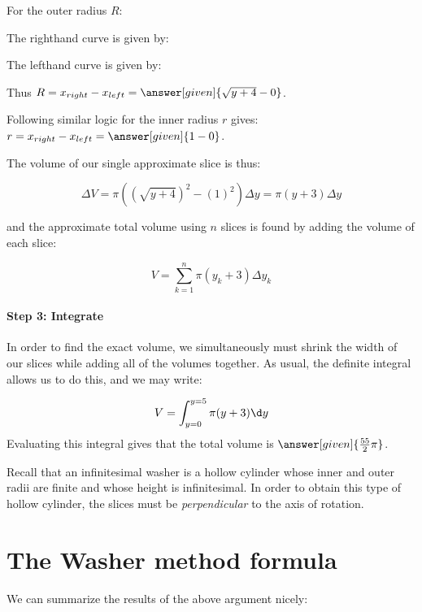 \documentclass{ximera}
\begin{document}
For the outer radius $R$:

The righthand curve is given by:
\begin{multipleChoice}
\end{multipleChoice}

The lefthand curve is given by:
\begin{multipleChoice}
\end{multipleChoice}

Thus $R = x_{right}-x_{left} = \answer[given]{\sqrt{y+4}-0}$.
            
Following similar logic for the inner radius $r$ gives: $r = x_{right}-x_{left} = \answer[given]{1-0}$.   
   
The volume of our single approximate slice is thus:

\[
\Delta V = \pi((\sqrt{y+4})^2-(1)^2)\Delta y = \pi(y+3)\Delta y
\]   
   
and the approximate total volume using $n$ slices is found by adding the volume of each slice:
   
\[
V = \sum_{k=1}^n \pi(y_k+3)\Delta y_k
\]      
   
\paragraph{Step 3: Integrate}
In order to find the exact volume, we simultaneously must shrink the width of our slices while adding all of the volumes together.  As usual, the definite integral allows us to do this, and we may write:

\[
V= \int_{y=0}^{y=5} \pi(y+3) \d y 
\]    
Evaluating this integral gives that the total volume is $\answer[given]{\frac{55}{2}\pi}$.   

\begin{remark}
Recall that an infinitesimal washer is a hollow cylinder whose inner and outer radii are finite and whose height is infinitesimal.  In order to obtain this type of hollow cylinder, the slices must be \emph{perpendicular} to the axis of rotation.
\end{remark}

\section{The Washer method formula}
We can summarize the results of the above argument nicely:
\end{document}
